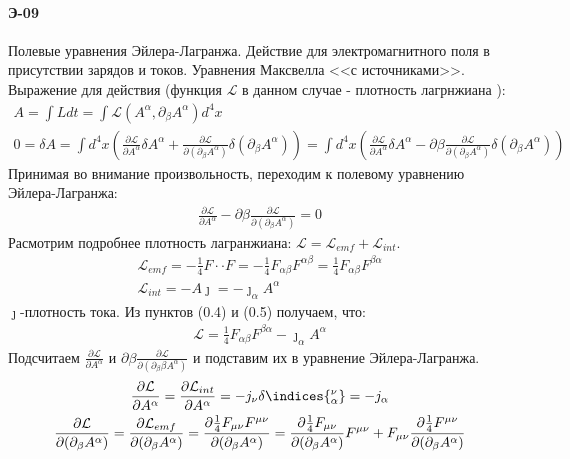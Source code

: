 



\paragraph{Э-09}
Полевые уравнения Эйлера-Лагранжа. Действие для электромагнитного поля в присутствии зарядов и токов. Уравнения Максвелла <<с источниками>>.\\

Выражение для действия (функция $\mathcal{L}$ в данном случае - плотность лагрнжиана ): 
\begin{gather}
A=\int Ldt=\int \mathcal{L}( A^{\alpha},\partial_\beta  A^{\alpha})d^4x\\
0=\delta A=
\int d^4x\left(
\frac{\partial \mathcal{L}}{\partial A^\alpha}\delta A^\alpha+\frac{\partial  \mathcal{L}}{\partial(\partial_\beta A^\alpha)}\delta(\partial_\beta A^\alpha)\right)=
\int d^4x(\frac{\partial \mathcal{L}}{\partial  A^\alpha}\delta A^\alpha-\partial\beta\frac{\partial  \mathcal{L}}{\partial(\partial_\beta A^\alpha)}\delta(\partial_\beta A^\alpha)) 
\end{gather}
Принимая во внимание произвольность, переходим к полевому уравнению Эйлера-Лагранжа: \\
\begin{gather}
\frac{\partial \mathcal{L}}{\partial  A^\alpha}-\partial\beta\frac{\partial  \mathcal{L}}{\partial(\partial_\beta A^\alpha)}=0
\end{gather}
Расмотрим подробнее плотность лагранжиана: $ \mathcal{L} = \mathcal{L}_{emf}+ \mathcal{L}_{int}.$\\
\begin{gather}
 \mathcal{L}_{emf}=-\frac{1}{4}F\cdot\cdot F=-\frac{1}{4}F_{\alpha\beta}F^{\alpha\beta}=\frac{1}{4}F_{\alpha\beta}F^{\beta\alpha}\\
 \mathcal{L}_{int}=- A\jmath=-\jmath_\alpha A^\alpha
\end{gather}
$\jmath$-плотность тока. Из пунктов (0.4) и (0.5) получаем, что:
\begin{gather}
 \mathcal{L}=\frac{1}{4}F_{\alpha\beta}F^{\beta\alpha}-\jmath_\alpha A^\alpha
\end{gather}
Подсчитаем $\frac{\partial \mathcal{L}}{\partial  A^\alpha}$ и $\partial\beta\frac{\partial  \mathcal{L}}{\partial(\partial_\beta\beta A^\alpha)}$ и подставим их в уравнение Эйлера-Лагранжа.
\begin{gather}
\frac{\partial \mathcal{L}}{\partial A^\alpha}=
\frac{\partial \mathcal{L}_{int}}{\partial  A^\alpha}=
-j_\nu\delta\indices{^\nu_\alpha} = -j_\alpha\\
\frac{\partial  \mathcal{L}}{\partial(\partial_\beta A^\alpha)}=\frac{\partial  \mathcal{L}_{emf}}{\partial(\partial_\beta A^\alpha)}=
\frac{\partial\frac{1}{4}F_{\mu\nu}F^{\mu\nu}}{\partial(\partial_\beta A^\alpha)} =
\frac{\partial\frac{1}{4}F_{\mu\nu}}{\partial(\partial_\beta A^\alpha)}F^{\mu\nu}+F_{\mu\nu}\frac{\partial\frac{1}{4}F^{\mu\nu}}{\partial(\partial_\beta A^\alpha)}
\end{gather}
